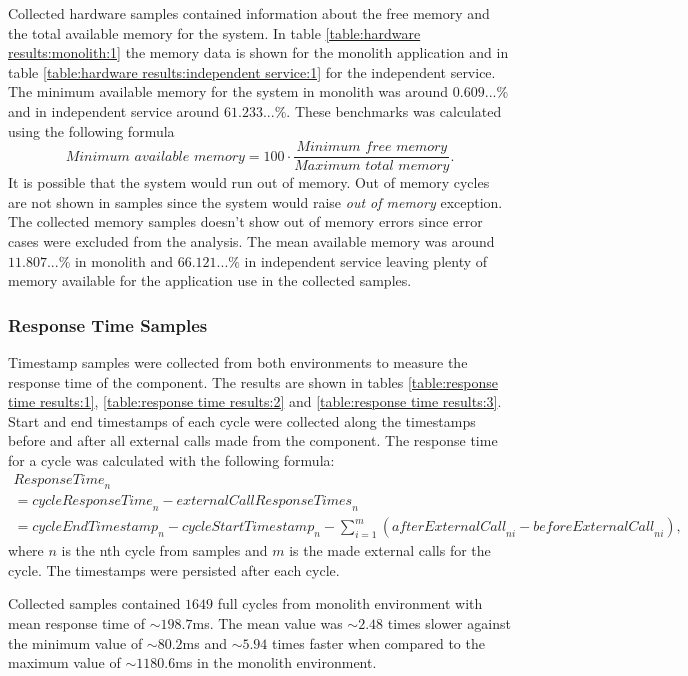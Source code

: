 Collected hardware samples contained information about the free memory and the total available memory for the system.
In table \ref{table:hardware results:monolith:1} the memory data is shown for the monolith application and in table \ref{table:hardware results:independent service:1} for the independent service.
The minimum available memory for the system in monolith was around $0.609...\%$ and in independent service around $61.233...\%$.
These benchmarks was calculated using the following formula
\[
\textit{Minimum available memory} = 100 \cdot \frac{\textit{Minimum free memory}}{\textit{Maximum total memory}}
.\]
It is possible that the system would run out of memory.
Out of memory cycles are not shown in samples since the system would raise \textit{out of memory} exception.
The collected memory samples doesn't show out of memory errors since error cases were excluded from the analysis.
The mean available memory was around $11.807...\%$ in monolith and $66.121...\%$ in independent service leaving plenty of memory available for the application use in the collected samples.

\subsubsection{Response Time Samples}
Timestamp samples were collected from both environments to measure the response time of the component.
The results are shown in tables \ref{table:response time results:1}, \ref{table:response time results:2} and \ref{table:response time results:3}.
Start and end timestamps of each cycle were collected along the timestamps before and after all external calls made from the component.
The response time for a cycle was calculated with the following formula:
\begin{gather*}
\textit{ResponseTime}_n
\\ =\textit{cycleResponseTime}_n - \textit{externalCallResponseTimes}_n
\\ = \textit{cycleEndTimestamp}_n - \textit{cycleStartTimestamp}_n - 
    \sum_{i=1}^{\textit{m}} (\textit{afterExternalCall}_{ni} -     \textit{beforeExternalCall}_{ni}),
\end{gather*}
where $n$ is the nth cycle from samples and $m$ is the made external calls for the cycle.
The timestamps were persisted after each cycle.

Collected samples contained $1649$ full cycles from monolith environment with mean response time of $\sim198.7$ms.
The mean value was $\sim2.48$ times slower against the minimum value of $\sim 80.2$ms and $\sim5.94$ times faster when compared to the maximum value of $\sim1180.6$ms in the monolith environment.

